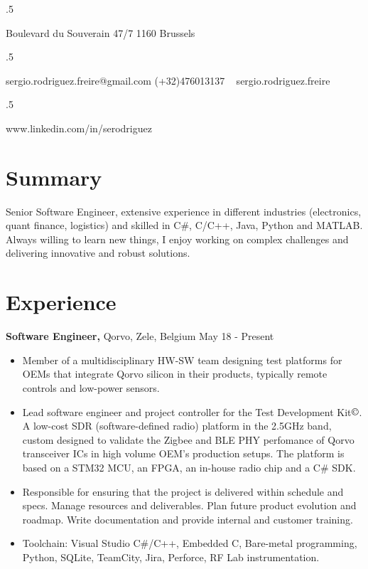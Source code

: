 \documentclass[margin]{res}
\begin{document}

\begin{resume}

\moveleft.5\hoffset\centerline{Boulevard du Souverain 47/7 1160 Brussels}
\moveleft.5\hoffset\centerline{sergio.rodriguez.freire@gmail.com \hspace{2 mm} \Mobilefone \hspace{1 mm} (+32)476013137 \hspace{2 mm} \faSkype\ \hspace{1 mm} sergio.rodriguez.freire}
\moveleft.5\hoffset\centerline{\faLinkedin \hspace{1 mm} www.linkedin.com/in/serodriguez}


\section{Summary}
Senior Software Engineer, extensive experience in different industries (electronics, quant finance, logistics) and skilled in C\#, C/C++, Java, Python and MATLAB. Always willing to learn new things, I enjoy working on complex challenges and delivering innovative and robust solutions. 

\section{Experience}

 {\bf Software Engineer,} Qorvo, Zele, Belgium \hfill May 18 - Present
 \begin{itemize} \itemsep -2pt
 \item Member of a multidisciplinary HW-SW team designing test platforms for OEMs that integrate Qorvo silicon in their products, typically remote controls and low-power sensors.
 \item Lead software engineer and project controller for the Test Development Kit$\copyright$. A low-cost SDR (software-defined radio) platform in the 2.5GHz band, custom designed to validate the Zigbee and BLE PHY perfomance of Qorvo transceiver ICs in high volume OEM's production setups. The platform is based on a STM32 MCU, an FPGA, an in-house radio chip and a C\# SDK.
 \item Responsible for ensuring that the project is delivered within schedule and specs. Manage resources and deliverables. Plan future product evolution and roadmap. Write documentation and provide internal and customer training.
 \item Toolchain: Visual Studio C\#/C++, Embedded C, Bare-metal programming, Python, SQLite, TeamCity, Jira, Perforce, RF Lab instrumentation.
\end{itemize}


\end{resume}
\end{document}
